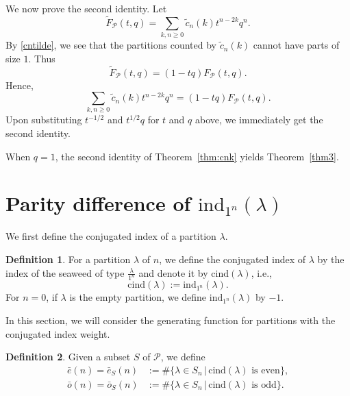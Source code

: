 \documentclass[reqno]{amsart}
\theoremstyle{definition}
\newtheorem{defn}{Definition}%
\newcommand{\ind}{\mathrm{ind}}
\newcommand{\cind}{\mathrm{cind}}
\newcommand{\pa}{\mathcal{P}}
\newcommand{\lam}{\lambda}
\newcommand{\be}{\bar{e}}
\newcommand{\bo}{\bar{o}}
\newcommand{\tc}{\tilde{c}}
\begin{document}
We now prove the second identity. Let
\begin{equation*}
\tilde{F}_{\pa} (t,q) = \sum_{ k,n\ge 0} \tc_n(k) t^{n-2k} q^n. 
\end{equation*}
By \eqref{cntilde}, we see that the  partitions counted by $\tc_n(k)$ cannot have parts of size $1$. Thus
$$
\tilde{F}_{\pa}(t,q)=(1-tq)F_{\pa}(t,q).
$$
Hence,
\begin{equation*}
\sum_{ k,n\ge 0}\tc_n(k) t^{n-2k} q^n=(1-tq) F_{\pa} (t,q).
\end{equation*}
Upon substituting $t^{-1/2}$ and $t^{1/2}q$ for $t$ and $q$ above, we immediately get the second identity. 

\endproof

When $q=1$, the second identity of Theorem~\ref{thm:cnk} yields Theorem~\ref{thm3}.

\section{Parity difference of $\ind_{1^n}(\lam)$}\label{sec5}

We first define the conjugated index of a partition $\lambda$. 
\begin{defn} 
For a partition $\lambda$ of $n$, we define the conjugated index of $\lambda$ by the index of the seaweed of type $\frac{\lambda}{1^n}$ and denote it by $\cind(\lambda)$, i.e.,
\begin{equation*}
\cind(\lambda):=\ind_{1^n}(\lambda).
\end{equation*}
For $n=0$, if $\lambda$ is the empty partition, we define $\ind_{1^n} (\lambda)$ by $-1$. 
\end{defn}

In this section, we will consider the generating function for partitions with the conjugated index weight. 

\begin{defn}
Given a subset $S$ of $\pa$, we define
\begin{align*}
    \be(n)=
    \be_{S}(n)&:= \# \{\lam\in S_n \, |\,   \mbox{$\cind(\lam)$ is even}\},\\
    \bo(n)=
    \bo_{S} (n)&:=\# \{\lam\in S_n \, |\,   \mbox{$\cind(\lam)$ is odd}\}.
\end{align*}
\end{defn}
\end{document}
